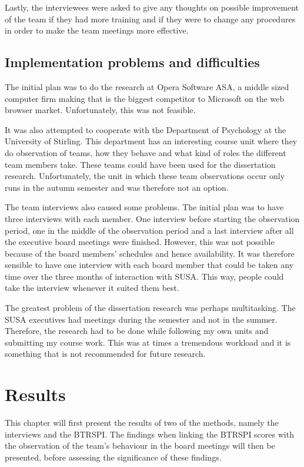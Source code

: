 \documentclass[a4paper,12pt,titlepage]{report}
\begin{document}
  Lastly, the interviewees were asked to give any thoughts on possible improvement
  of the team if they had more training and if they were to change any procedures
  in order to make the team meetings more effective.

  \section{Implementation problems and difficulties~\label{difficulties}}
  The initial plan was to do the research at Opera Software ASA, a middle
  sized computer firm making that is the biggest competitor to
  Microsoft on the web browser market. Unfortunately, this was not feasible.

  It was also attempted to cooperate with the Department of Psychology at
  the University of Stirling. This department has an interesting
  course unit where they do observation of teams,
  how they behave and what kind of roles the different
  team members take. These teams could have been used for the
  dissertation research. Unfortunately, the unit in which these team
  observations occur only runs in the autumn semester
  and was therefore not an option.

  The team interviews also caused some problems. The initial plan was to
  have three interviews with each member. One interview before starting
  the observation period, one in
  the middle of the observation period and a last interview
  after all the executive board meetings were finished.
  However, this was not possible because of the board
  members' schedules and hence availability. It was therefore sensible to have
  one interview with each board member that could be taken any time over the three months
  of interaction with SUSA. This way, people could take the interview whenever
  it suited them best.

  The greatest problem of the dissertation research was perhaps multitasking.
  The SUSA executives had meetings during the semester and not in the
  summer. Therefore, the research had to be done while following my own 
  units and submitting my course work. This was at times a tremendous workload
  and it is something that is not recommended for future research.

  \chapter{Results}
  This chapter will first present the results of two of the methods,
  namely the interviews and the BTRSPI.
  The findings when linking the BTRSPI scores with the
  observation of the team's behaviour in the board meetings will then
  be presented, before assessing the significance of these findings.
\end{document}
